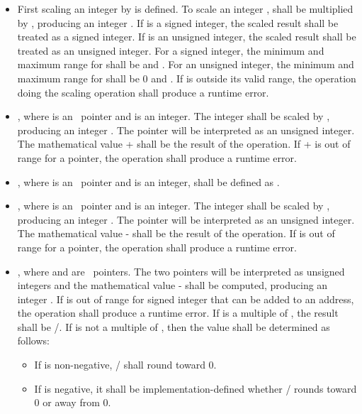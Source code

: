\begin{itemize}
\item
  First scaling an integer by  is
  defined. To scale an integer ,  shall be multiplied by
  , producing an integer . If
   is a signed integer, the scaled result shall be treated as a
  signed integer. If  is an unsigned integer, the scaled result
  shall be treated as an unsigned integer. For a signed integer, the
  minimum and maximum range for  shall be  and
  . For an unsigned integer, the minimum and maximum
  range for  shall be 0 and . If  is
  outside its valid range, the operation doing the scaling operation
  shall produce a runtime error.
\item
   \code{+} , where  is an
  \arrayptrT\ pointer
  and  is an integer. The integer  shall be scaled by
  , producing an integer . The
  pointer  will be interpreted as an unsigned integer. The mathematical
  value  +  shall be the result of the operation. If
   +  is out of range for a pointer, the operation shall
  produce a runtime error.
\item
   \code{+} , where  is an
  \arrayptrT\ pointer
  and  is an integer, shall be defined as  \code{+}
  .
\item
   \code{-} , where  is an
  \arrayptrT\ pointer
  and  is an integer. The integer  shall be scaled by
  , producing an integer . The
  pointer  will be interpreted as an unsigned integer. The
  mathematical value  -  shall be the result of the
  operation. If   is out of range for a pointer, the
  operation shall produce a runtime error.
\item
   \code{-} , where  and  are
  \arrayptrT\
  pointers. The two pointers will be interpreted as unsigned integers
  and the mathematical value \var{p} - \var{q} shall be computed,
  producing an integer . If  is out of range for signed
  integer that can be added to an address, the operation shall produce a
  runtime error. If  is a multiple of
  , the result shall be
  /. If \var{j} is not a
  multiple of \sizeof{\var{T}}, then the value shall
  be determined as follows:

  \begin{itemize}
  \item
    If  is non-negative,
    \var{j}/ shall round toward 0.
  \item
    If  is negative, it shall be implementation-defined whether
    \var{j}/\sizeof{\var{T}} rounds toward 0 or away
    from 0.
  \end{itemize}
\end{itemize}

